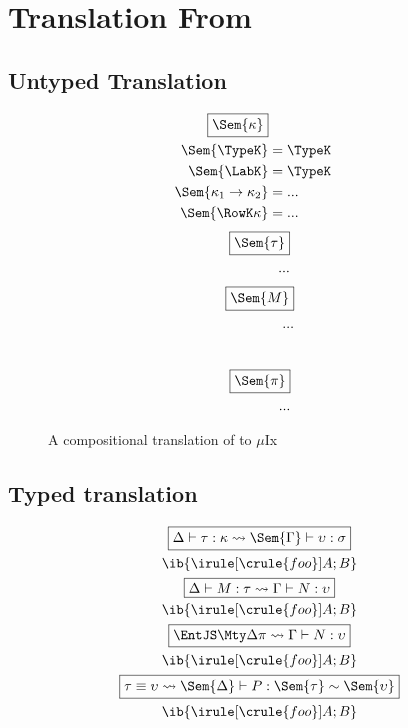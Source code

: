 \documentclass[12pt]{article}
\newcommand\MuIx{\ensuremath{\mu}Ix}
\begin{document}
\section{Translation From \RO}

\subsection{Untyped Translation}

\begin{figure}[H]
\begin{align*}
\fbox{$\Sem{\kappa}$} \\
\vspace{5em}
\Sem{\TypeK} &= \TypeK \\
\Sem{\LabK} &= \TypeK \\
\Sem{\kappa_1 \to \kappa_2} &= ... \\
\Sem{\RowK \kappa} &= ... \\
\end{align*}
\begin{align*}
\fbox{$\Sem{\tau}$} \\
\vspace{5em}
...
\end{align*}
\begin{align*}
\fbox{$\Sem{M}$} \\
\vspace{5em}
...
\end{align*} \\
\begin{align*}
\fbox{$\Sem{\pi}$} \\
\vspace{5em}
...
\end{align*}
\caption{A compositional translation of \RO to \MuIx{}}
\label{fig:translation}
\end{figure}


\subsection{Typed translation}

\begin{figure}[H]
\small
\begin{gather*}
\fbox{$\Delta \vdash \tau : \kappa \leadsto \Sem{\Gamma} \vdash \upsilon : \sigma$}
\\
\ib{\irule[\crule{foo}]{A};{B}} \\
\fbox{$\Delta \vdash M : \tau \leadsto \Gamma \vdash N : \upsilon$}
\\
\ib{\irule[\crule{foo}]{A};{B}} \\
\fbox{${\EntJ \Delta \pi} \leadsto \Gamma \vdash N : \upsilon$}
\\
\ib{\irule[\crule{foo}]{A};{B}}  \\
\fbox{${\tau \equiv \upsilon} \leadsto \Sem{\Delta} \vdash P : \Sem{\tau} \sim \Sem{\upsilon}$}
\\
\ib{\irule[\crule{foo}]{A};{B}} 
\end{gather*}
\end{figure}
\end{document}
